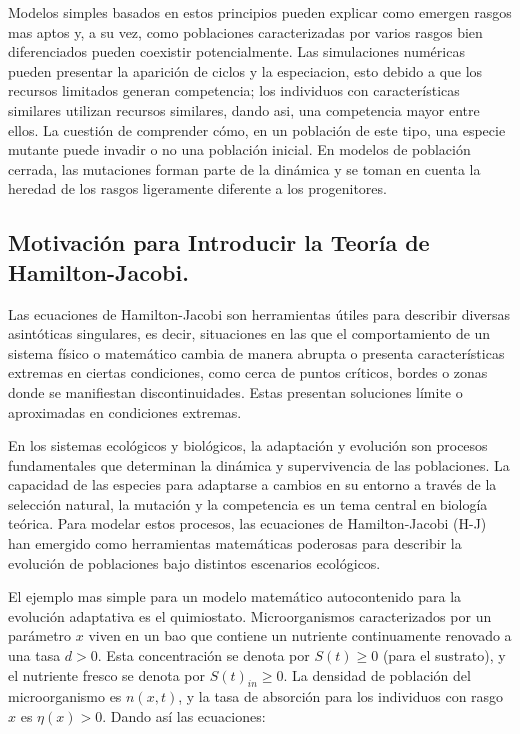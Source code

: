 Modelos simples basados en estos principios pueden explicar como emergen rasgos mas aptos y, a su vez, como poblaciones caracterizadas por varios rasgos bien diferenciados pueden coexistir potencialmente. Las simulaciones numéricas pueden presentar la aparición de ciclos y la especiacion, esto debido a que los recursos limitados generan competencia; los individuos con características similares utilizan recursos similares, dando asi, una competencia mayor entre ellos. La cuestión de comprender cómo, en un población de este tipo, una especie mutante puede invadir o no una población inicial. En modelos de población cerrada, las mutaciones forman parte de la dinámica y se toman en cuenta la heredad de los rasgos ligeramente diferente a los progenitores.

\subsection{Motivación para Introducir la Teoría de Hamilton-Jacobi.}

\citep{barles2007} Las ecuaciones de Hamilton-Jacobi son herramientas útiles para describir diversas asintóticas singulares, es decir, situaciones en las que el comportamiento de un sistema físico o matemático cambia  de manera abrupta o presenta características extremas en ciertas condiciones, como cerca de puntos críticos, bordes o zonas donde se manifiestan discontinuidades. Estas presentan soluciones límite o aproximadas en condiciones extremas.


En los sistemas ecológicos y biológicos, la adaptación y evolución son procesos fundamentales que determinan la dinámica y supervivencia de las poblaciones. La capacidad de las especies para adaptarse a cambios en su entorno a través de la selección natural, la mutación y la competencia es un tema central en biología teórica. Para modelar estos procesos, las ecuaciones de Hamilton-Jacobi (H-J) han emergido como herramientas matemáticas poderosas para describir la evolución de poblaciones bajo distintos escenarios ecológicos.

\citep{Mirrahimi2011}El ejemplo mas simple para un modelo matemático autocontenido para la evolución adaptativa es el quimiostato. Microorganismos caracterizados por un parámetro $x$ viven en un bao que contiene un nutriente continuamente renovado a una tasa $d>0$. Esta concentración se denota por $S(t)\geq0$ (para el sustrato), y el nutriente fresco se denota por $S(t)_{in}\geq0$. La densidad de población del microorganismo es $n(x,t)$, y la tasa de absorción para los individuos con rasgo $x$ es $\eta(x)>0$. Dando así las ecuaciones:

